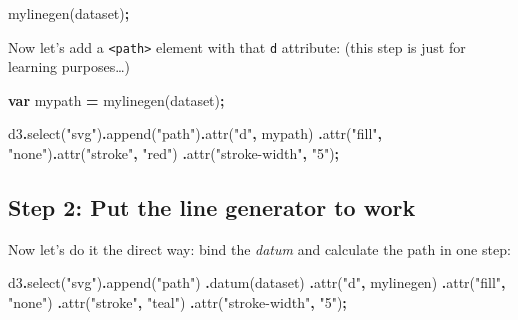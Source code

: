 \documentclass[
  openany]{book}
\newenvironment{Shaded}{\begin{snugshade}}{\end{snugshade}}
\newcommand{\FunctionTok}[1]{\textcolor[rgb]{0.00,0.00,0.00}{#1}}
\newcommand{\KeywordTok}[1]{\textcolor[rgb]{0.13,0.29,0.53}{\textbf{#1}}}
\newcommand{\NormalTok}[1]{#1}
\newcommand{\OperatorTok}[1]{\textcolor[rgb]{0.81,0.36,0.00}{\textbf{#1}}}
\newcommand{\StringTok}[1]{\textcolor[rgb]{0.31,0.60,0.02}{#1}}
\begin{document}
\begin{Shaded}
\begin{Highlighting}[]
\NormalTok{mylinegen(dataset)}\OperatorTok{;}
\end{Highlighting}
\end{Shaded}

Now let's add a \texttt{\textless{}path\textgreater{}} element with that \texttt{d} attribute: (this step is just for learning purposes\ldots)

\begin{Shaded}
\begin{Highlighting}[]
\KeywordTok{var}\NormalTok{ mypath }\OperatorTok{=}\NormalTok{ mylinegen(dataset)}\OperatorTok{;}

\NormalTok{d3}\OperatorTok{.}\FunctionTok{select}\NormalTok{(}\StringTok{"svg"}\NormalTok{)}\OperatorTok{.}\FunctionTok{append}\NormalTok{(}\StringTok{"path"}\NormalTok{)}\OperatorTok{.}\FunctionTok{attr}\NormalTok{(}\StringTok{"d"}\OperatorTok{,}\NormalTok{ mypath)}
    \OperatorTok{.}\FunctionTok{attr}\NormalTok{(}\StringTok{"fill"}\OperatorTok{,} \StringTok{"none"}\NormalTok{)}\OperatorTok{.}\FunctionTok{attr}\NormalTok{(}\StringTok{"stroke"}\OperatorTok{,} \StringTok{"red"}\NormalTok{)}
    \OperatorTok{.}\FunctionTok{attr}\NormalTok{(}\StringTok{"stroke{-}width"}\OperatorTok{,} \StringTok{"5"}\NormalTok{)}\OperatorTok{;}
\end{Highlighting}
\end{Shaded}

\hypertarget{step-2-put-the-line-generator-to-work}{%
\subsection{Step 2: Put the line generator to work}\label{step-2-put-the-line-generator-to-work}}

Now let's do it the direct way: bind the \emph{datum} and calculate the path in one step:

\begin{Shaded}
\begin{Highlighting}[]
\NormalTok{d3}\OperatorTok{.}\FunctionTok{select}\NormalTok{(}\StringTok{"svg"}\NormalTok{)}\OperatorTok{.}\FunctionTok{append}\NormalTok{(}\StringTok{"path"}\NormalTok{)}
    \OperatorTok{.}\FunctionTok{datum}\NormalTok{(dataset)}
    \OperatorTok{.}\FunctionTok{attr}\NormalTok{(}\StringTok{"d"}\OperatorTok{,}\NormalTok{ mylinegen)}
    \OperatorTok{.}\FunctionTok{attr}\NormalTok{(}\StringTok{"fill"}\OperatorTok{,} \StringTok{"none"}\NormalTok{)}
    \OperatorTok{.}\FunctionTok{attr}\NormalTok{(}\StringTok{"stroke"}\OperatorTok{,} \StringTok{"teal"}\NormalTok{)}
    \OperatorTok{.}\FunctionTok{attr}\NormalTok{(}\StringTok{"stroke{-}width"}\OperatorTok{,} \StringTok{"5"}\NormalTok{)}\OperatorTok{;}
\end{Highlighting}
\end{Shaded}
\end{document}
